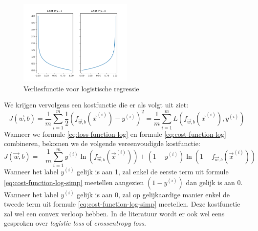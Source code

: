 \begin{figure}[h]
	\centering
	\includegraphics[width=0.5\textwidth]{images/10-loss-function-log.png}
	\caption{Verliesfunctie voor logistische regressie}
	\label{fig:loss-function-log}
\end{figure}
\noindent
We krijgen vervolgens een kostfunctie die er als volgt uit ziet:
\begin{equation}
	J(\vec{w}, b) = \frac{1}{m} \sum_{i=1}^{m} \frac{1}{2}(f_{\vec{w},b}(\vec{x}^{(i)}) - y^{(i)})^{2} = \frac{1}{m} \sum_{i=1}^{m} L(f_{\vec{w},b}(\vec{x}^{(i)}), y^{(i)})
	\label{eq:cost-function-log}
\end{equation}
\noindent
Wanneer we formule \ref{eq:loss-function-log} en formule \ref{eq:cost-function-log} combineren, bekomen we de volgende vereenvoudigde kostfunctie:
\begin{equation}
	J(\vec{w}, b) = -\frac{1}{m} \sum_{i=1}^{m} y^{(i)}\ln(f_{\vec{w},b}(\vec{x}^{(i)})) + (1 - y^{(i)}) \ln(1 - f_{\vec{w},b}(\vec{x}^{(i)})) 
	\label{eq:cost-function-log-simp}
\end{equation}
\noindent
Wanneer het label $y^{(i)}$ gelijk is aan 1, zal enkel de eerste term uit formule \ref{eq:cost-function-log-simp} meetellen aangezien $(1 - y^{(i)})$ dan gelijk is aan 0. Wanneer het label $y^{(i)}$ gelijk is aan 0, zal op gelijkaardige manier enkel de tweede term uit formule \ref{eq:cost-function-log-simp} meetellen. Deze kostfunctie zal wel een convex verloop hebben. In de literatuur wordt er ook wel eens gesproken over \textit{logistic loss} of \textit{crossentropy loss}.


